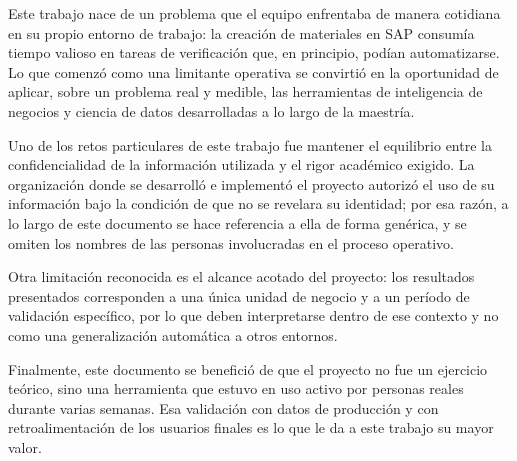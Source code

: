 Este trabajo nace de un problema que el equipo enfrentaba de manera cotidiana en su propio entorno de trabajo: la creación de materiales en SAP consumía tiempo valioso en tareas de verificación que, en principio, podían automatizarse. Lo que comenzó como una limitante operativa se convirtió en la oportunidad de aplicar, sobre un problema real y medible, las herramientas de inteligencia de negocios y ciencia de datos desarrolladas a lo largo de la maestría.

Uno de los retos particulares de este trabajo fue mantener el equilibrio entre la confidencialidad de la información utilizada y el rigor académico exigido. La organización donde se desarrolló e implementó el proyecto autorizó el uso de su información bajo la condición de que no se revelara su identidad; por esa razón, a lo largo de este documento se hace referencia a ella de forma genérica, y se omiten los nombres de las personas involucradas en el proceso operativo.

Otra limitación reconocida es el alcance acotado del proyecto: los resultados presentados corresponden a una única unidad de negocio y a un período de validación específico, por lo que deben interpretarse dentro de ese contexto y no como una generalización automática a otros entornos.

Finalmente, este documento se benefició de que el proyecto no fue un ejercicio teórico, sino una herramienta que estuvo en uso activo por personas reales durante varias semanas. Esa validación con datos de producción y con retroalimentación de los usuarios finales es lo que le da a este trabajo su mayor valor.